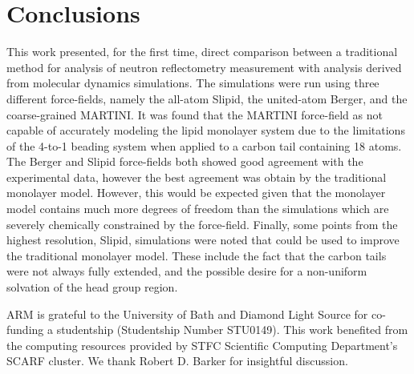 \documentclass[amsmath,amssymb,twocolumn,superscriptaddress,aps,prl]{revtex4-1}
\begin{document}
\section{Conclusions}
This work presented, for the first time, direct comparison between a traditional method for analysis of neutron reflectometry measurement with analysis derived from molecular dynamics simulations.
The simulations were run using three different force-fields, namely the all-atom Slipid, the united-atom Berger, and the coarse-grained MARTINI.
It was found that the MARTINI force-field as not capable of accurately modeling the lipid monolayer system due to the limitations of the 4-to-1 beading system when applied to a carbon tail containing 18 atoms.
The Berger and Slipid force-fields both showed good agreement with the experimental data, however the best agreement was obtain by the traditional monolayer model.
However, this would be expected given that the monolayer model contains much more degrees of freedom than the simulations which are severely chemically constrained by the force-field.
Finally, some points from the highest resolution, Slipid, simulations were noted that could be used to improve the traditional monolayer model.
These include the fact that the carbon tails were not always fully extended, and the possible desire for a non-uniform solvation of the head group region.

\begin{acknowledgements}
ARM is grateful to the University of Bath and Diamond Light Source for co-funding a studentship (Studentship Number STU0149). This work benefited from the computing resources provided by STFC Scientific Computing Department's SCARF cluster. We thank Robert D. Barker for insightful discussion.
\end{acknowledgements}


\end{document}

